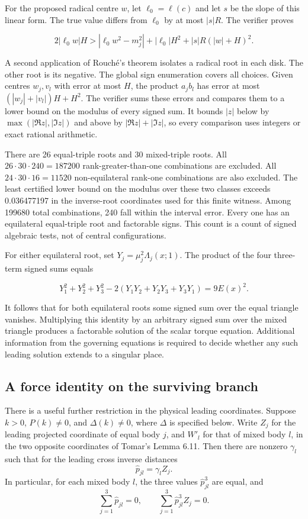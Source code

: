 \documentclass[11pt,letterpaper]{article}
\theoremstyle{definition}
\begin{document}
For the proposed radical centre \(w\), let \(\ell_0=\ell(c)\) and let \(s\) be the slope of this linear form. The true value differs from \(\ell_0\) by at most \(|s|R\). The verifier proves

\[
2|\ell_0w|H>
|\ell_0w^2-m_j^2|+|\ell_0|H^2+|s|R(|w|+H)^2.
\]

A second application of Rouché's theorem isolates a radical root in each disk. The other root is its negative. The global sign enumeration covers all choices. Given centres \(w_j,v_l\) with error at most \(H\), the product \(a_jb_l\) has error at most \((|w_j|+|v_l|)H+H^2\). The verifier sums these errors and compares them to a lower bound on the modulus of every signed sum. It bounds \(|z|\) below by \(\max(|\Re z|,|\Im z|)\) and above by \(|\Re z|+|\Im z|\), so every comparison uses integers or exact rational arithmetic.

There are 26 equal-triple roots and 30 mixed-triple roots. All \(26\cdot30\cdot240=187200\) rank-greater-than-one combinations are excluded. All \(24\cdot30\cdot16=11520\) non-equilateral rank-one combinations are also excluded. The least certified lower bound on the modulus over these two classes exceeds 0.036477197 in the inverse-root coordinates used for this finite witness. Among 199680 total combinations, 240 fall within the interval error. Every one has an equilateral equal-triple root and factorable signs. This count is a count of signed algebraic tests, not of central configurations.

For either equilateral root, set \(Y_j=\mu_j^2\Lambda_j(x;1)\). The product of the four three-term signed sums equals

\[
Y_1^2+Y_2^2+Y_3^2-2(Y_1Y_2+Y_2Y_3+Y_3Y_1)=9E(x)^2.
\]

It follows that for both equilateral roots some signed sum over the equal triangle vanishes. Multiplying this identity by an arbitrary signed sum over the mixed triangle produces a factorable solution of the scalar torque equation. Additional information from the governing equations is required to decide whether any such leading solution extends to a singular place.

\subsection*{A force identity on the surviving branch}

There is a useful further restriction in the physical leading coordinates. Suppose
\(k>0\), \(P(k)\ne0\), and \(\Delta(k)\ne0\), where $\Delta$ is specified below. Write \(Z_j\) for the leading
projected coordinate of equal body \(j\), and \(W'_l\) for that of mixed
body \(l\), in the two opposite coordinates of Tomar's Lemma 6.11. Then
there are nonzero \(\gamma_l\) such that for the leading cross inverse
distances
\[
   \widehat p_{jl}=\gamma_l Z_j .
\]
In particular, for each mixed body \(l\), the three values
\(\widehat p_{jl}^3\) are equal, and
\[
\sum_{j=1}^3\widehat p_{jl}=0,\qquad
\sum_{j=1}^3\widehat p_{jl}^3 Z_j=0.
\]
\end{document}
